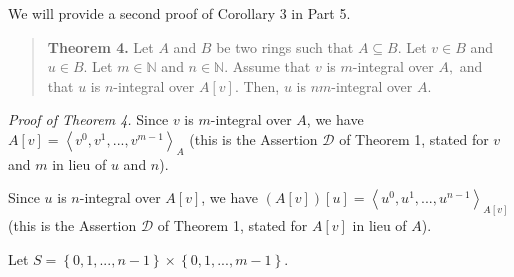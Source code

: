 \documentclass[12pt,final,notitlepage,onecolumn]{article}%
\begin{document}
We will provide a second proof of Corollary 3 in Part 5.

\begin{quote}
\textbf{Theorem 4.} Let $A$ and $B$ be two rings such that $A\subseteq B$. Let
$v\in B$ and $u\in B$. Let $m\in\mathbb{N}$ and $n\in\mathbb{N}$. Assume that
$v$ is $m$-integral over $A,$ and that $u$ is $n$-integral over $A\left[
v\right]  $. Then, $u$ is $nm$-integral over $A$.
\end{quote}

\textit{Proof of Theorem 4.} Since $v$ is $m$-integral over $A$, we have
$A\left[  v\right]  =\left\langle v^{0},v^{1},...,v^{m-1}\right\rangle _{A}$
(this is the Assertion $\mathcal{D}$ of Theorem 1, stated for $v$ and $m$ in
lieu of $u$ and $n$).

Since $u$ is $n$-integral over $A\left[  v\right]  $, we have $\left(
A\left[  v\right]  \right)  \left[  u\right]  =\left\langle u^{0}%
,u^{1},...,u^{n-1}\right\rangle _{A\left[  v\right]  }$ (this is the Assertion
$\mathcal{D}$ of Theorem 1, stated for $A\left[  v\right]  $ in lieu of $A$).

Let $S=\left\{  0,1,...,n-1\right\}  \times\left\{  0,1,...,m-1\right\}  $.
\end{document}
